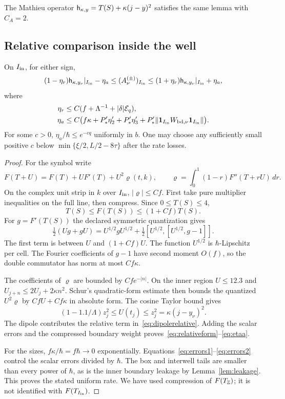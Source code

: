 The Mathieu operator $\mathsf h_{\kappa,y}=T(S)+\kappa(j-y)^2$ satisfies the same lemma with $C_A=2$.

\subsection{Relative comparison inside the well}
\begin{proposition}\label{prop:relative}
On $I_{\rm in}$, for either sign,
\begin{equation}\label{eq:relativeform}
 (1-\eta_r)\mathsf h_{\kappa,y_\nu}|_{I_{\rm in}}-\eta_a
 \le (A_\nu^{(\pm)})_{I_{\rm in}}
 \le(1+\eta_r)\mathsf h_{\kappa,y_\nu}|_{I_{\rm in}}+\eta_a,
\end{equation}
where
\begin{align}
 \eta_r&\le C(f+\Lambda^{-1}+|\delta|\mathcal E_q),\label{eq:etar}\\
 \eta_a&\le C\bigl(f\kappa+P_*'\eta_2'+P_*'\eta_3'
       +P_*'\lVert \mathbf 1_{I_{\rm in}}W_{{\rm bd},\nu}\mathbf 1_{I_{\rm in}}\rVert\bigr).
 \label{eq:etaa}
\end{align}
For some $c>0$, $\eta_a/\hbar\le e^{-cq}$ uniformly in $b$. One may choose any sufficiently small positive $c$ below $\min\{\xi/2,L/2-8\tau\}$ after the rate losses.
\end{proposition}
\begin{proof}
For the symbol write
\[
 F(T+U)=F(T)+UF'(T)+U^2\varrho(t,k),\qquad
 \varrho=\int_0^1(1-r)F''(T+rU)\,dr.
\]
On the complex unit strip in $k$ over $I_{\rm in}$, $|\varrho|\le Cf$. First take pure multiplier inequalities on the full line, then compress. Since $0\le T(S)\le4$,
\[
 T(S)\le F(T(S))\le(1+Cf)T(S).
\]
For $g=F'(T(S))$ the declared symmetric quantization gives
\[
 \tfrac12(Ug+gU)=U^{1/2}gU^{1/2}
                 +\tfrac12[U^{1/2},[U^{1/2},g-1]].
\]
The first term is between $U$ and $(1+Cf)U$. The function $U^{1/2}$ is $\hbar$-Lipschitz per cell. The Fourier coefficients of $g-1$ have second moment $O(f)$, so the double commutator has norm at most $Cf\kappa$.

The coefficients of $\varrho$ are bounded by $Cfe^{-|n|}$. On the inner region $U\le12.3$ and
$U_{j+n}\le2U_j+2\kappa n^2$. Schur's quadratic-form estimate then bounds the quantized $U^2\varrho$ by $CfU+Cf\kappa$ in absolute form. The cosine Taylor bound gives
\[
 (1-1.1/\Lambda)z_j^2\le U(t_j)\le z_j^2
          =\kappa(j-y_\nu)^2.
\]
The dipole contributes the relative term in~\eqref{eq:dipolerelative}. Adding the scalar errors and the compressed boundary weight proves~\eqref{eq:relativeform}--\eqref{eq:etaa}.

For the sizes, $f\kappa/\hbar=f\hbar\to0$ exponentially. Equations~\eqref{eq:errors1}--\eqref{eq:errors2} control the scalar errors divided by $\hbar$. The box and interwell tails are smaller than every power of $\hbar$, as is the inner boundary leakage by Lemma~\ref{lem:leakage}. This proves the stated uniform rate. We have used compression of $F(T_{\mathbb Z})$; it is not identified with $F(T_{I_{\rm in}})$.
\end{proof}

